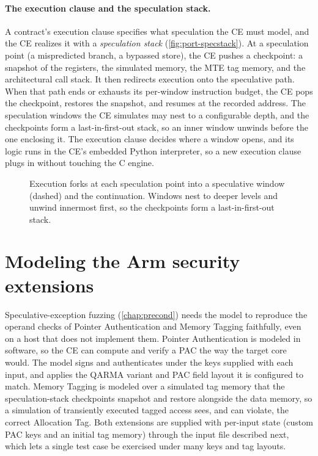 \paragraph{The execution clause and the speculation stack.}
A contract's execution clause specifies what speculation the CE must model, and the CE
realizes it with a \emph{speculation stack} (\autoref{fig:port-specstack}). At a speculation
point (a mispredicted branch, a bypassed store), the CE pushes a checkpoint: a snapshot of the registers, the simulated
memory, the MTE tag memory, and the architectural call stack. It then redirects execution
onto the speculative path. When that path ends or exhausts its per-window instruction budget,
the CE pops the checkpoint, restores the snapshot, and resumes at the recorded address.
The speculation windows the CE simulates may nest to a configurable depth, and the checkpoints
form a last-in-first-out stack, so an inner window unwinds before the one enclosing it. The execution clause decides where a window opens,
and its logic runs in the CE's embedded Python interpreter, so a new execution clause plugs in
without touching the C engine.

\begin{figure}[hb]
\centering
\fitwidth{}
\caption{Execution forks at each speculation point into a speculative window (dashed) and the
continuation. Windows nest to deeper levels and unwind innermost first, so the checkpoints form
a last-in-first-out stack.}
\label{fig:port-specstack}
\end{figure}

\section{Modeling the Arm security extensions}
\label{sec:port-features}

Speculative-exception fuzzing (\autoref{chap:precond}) needs the model to reproduce the operand
checks of Pointer Authentication and Memory Tagging faithfully, even on a host that does not
implement them. Pointer Authentication is modeled in software, so the CE can compute and verify a PAC the way
the target core would. The model signs and authenticates under the keys supplied with each
input, and applies the QARMA variant and PAC field layout it is configured to match. Memory Tagging is modeled over a simulated tag memory that the speculation-stack
checkpoints snapshot and restore alongside the data memory, so a simulation of transiently
executed tagged access sees, and can violate, the correct Allocation Tag. Both extensions are supplied with
per-input state (custom PAC keys and an initial tag memory) through the input file described
next, which lets a single test case be exercised under many keys and tag layouts.

